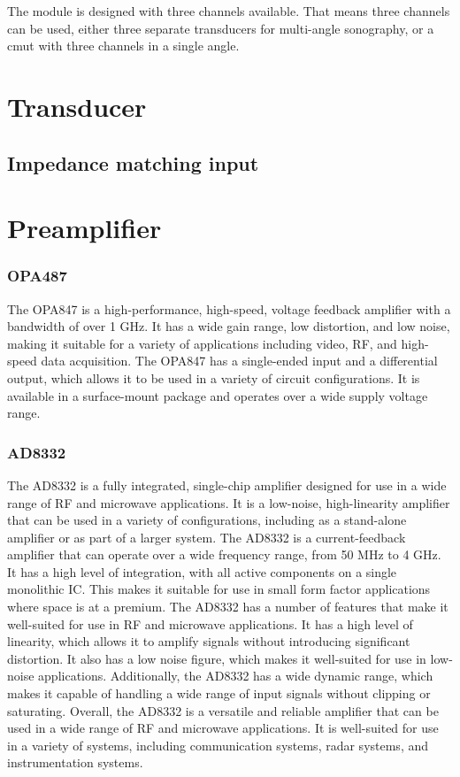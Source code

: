 The module is designed with three channels available. That means three channels can be used, either three separate transducers for multi-angle sonography, or a \gls{cmut} with three channels in a single angle.

\section{Transducer}

\subsection{Impedance matching input}

\section{Preamplifier}
\subsubsection{OPA487}
The OPA847\cite{OPA847} is a high-performance, high-speed, voltage feedback amplifier with a bandwidth of over 1 GHz. It has a wide gain range, low distortion, and low noise, making it suitable for a variety of applications including video, RF, and high-speed data acquisition. The OPA847 has a single-ended input and a differential output, which allows it to be used in a variety of circuit configurations. It is available in a surface-mount package and operates over a wide supply voltage range.

\subsubsection{AD8332}
The AD8332\cite{AD8332} is a fully integrated, single-chip amplifier designed for use in a wide range of RF and microwave applications. It is a low-noise, high-linearity amplifier that can be used in a variety of configurations, including as a stand-alone amplifier or as part of a larger system. The AD8332 is a current-feedback amplifier that can operate over a wide frequency range, from 50 MHz to 4 GHz. It has a high level of integration, with all active components on a single monolithic IC. This makes it suitable for use in small form factor applications where space is at a premium. The AD8332 has a number of features that make it well-suited for use in RF and microwave applications. It has a high level of linearity, which allows it to amplify signals without introducing significant distortion. It also has a low noise figure, which makes it well-suited for use in low-noise applications. Additionally, the AD8332 has a wide dynamic range, which makes it capable of handling a wide range of input signals without clipping or saturating. Overall, the AD8332 is a versatile and reliable amplifier that can be used in a wide range of RF and microwave applications. It is well-suited for use in a variety of systems, including communication systems, radar systems, and instrumentation systems.

